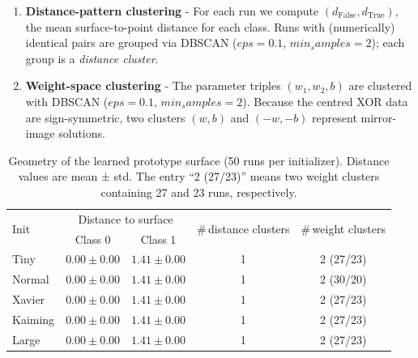 \begin{enumerate}[label=(G\arabic*)]
    \item \textbf{Distance-pattern clustering} -  
          For each run we compute \((d_{\text{False}},d_{\text{True}})\),
          the mean surface-to-point distance for each class.
          Runs with (numerically) identical pairs are grouped via  DBSCAN ($eps = 0.1$, $min_samples = 2$);
          each group is a \emph{distance cluster}.
    \item \textbf{Weight-space clustering} -  
          The parameter triples \((w_1,w_2,b)\) are clustered with DBSCAN ($eps = 0.1$, $min_samples = 2$).
          Because the centred XOR data are sign-symmetric, two clusters
          \((w,b)\) and \((-w,-b)\) represent mirror-image solutions.
\end{enumerate}

\begin{table}[h]
\centering
\caption{Geometry of the learned prototype surface (50 runs per
initializer).  Distance values are mean ± std.  The entry
“2 (27/23)” means two weight clusters containing 27 and 23 runs,
respectively.}
\label{tab:abs1-init-geometry}
\begin{tabular}{lcccc}
\toprule
\multirow{2}{*}{Init} &
\multicolumn{2}{c}{Distance to surface} &
\multirow{2}{*}{\#\,distance clusters} &
\multirow{2}{*}{\#\,weight clusters} \\
\cmidrule(lr){2-3}
 & Class 0 & Class 1 & & \\
\midrule
Tiny    & $0.00\pm0.00$ & $1.41\pm0.00$ & 1 & 2 (27/23) \\
Normal  & $0.00\pm0.00$ & $1.41\pm0.00$ & 1 & 2 (30/20) \\
Xavier  & $0.00\pm0.00$ & $1.41\pm0.00$ & 1 & 2 (27/23) \\
Kaiming & $0.00\pm0.00$ & $1.41\pm0.00$ & 1 & 2 (27/23) \\
Large   & $0.00\pm0.00$ & $1.41\pm0.00$ & 1 & 2 (27/23) \\
\bottomrule
\end{tabular}
\end{table}

